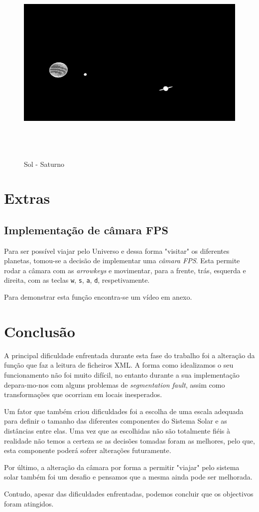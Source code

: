 \documentclass[11pt,a4paper]{report}
\begin{document}
\begin{figure}[H]
\centering
\includegraphics[width = 18cm,height = 10cm]{7.png}
\caption{Sol - Saturno}
\label{fig:demo7}
\end{figure}


\chapter{Extras}
\section{Implementação de câmara FPS}

Para ser possível viajar pelo Universo e dessa forma "visitar" os diferentes planetas, tomou-se a decisão de implementar uma \textit{câmara FPS}. Esta permite rodar a câmara com as \textit{arrowkeys} e movimentar, para a frente, trás, esquerda e direita, com as teclas \texttt{w}, \texttt{s}, \texttt{a}, \texttt{d}, respetivamente.


Para demonstrar esta função encontra-se um vídeo em anexo.

\newpage
\chapter{Conclusão}
A principal dificuldade enfrentada durante esta fase do trabalho foi a alteração da função que faz a leitura de ficheiros XML. A forma como idealizamos o seu funcionamento não foi muito difícil, no entanto durante a sua implementação depara-mo-nos com alguns problemas de \textit{segmentation fault}, assim como transformações que ocorriam em locais inesperados. 

Um fator que também criou dificuldades foi a escolha de uma escala adequada para definir o tamanho das diferentes componentes do Sistema Solar e as distâncias entre elas. Uma vez que as escolhidas não são totalmente fiéis à realidade não temos a certeza se as decisões tomadas foram as melhores, pelo que, esta componente poderá sofrer alterações futuramente.

Por último, a alteração da câmara por forma a permitir "viajar" pelo sistema solar também foi um desafio e pensamos que a mesma ainda pode ser melhorada.

Contudo, apesar das dificuldades enfrentadas, podemos concluir que os objectivos foram atingidos.
\end{document}
